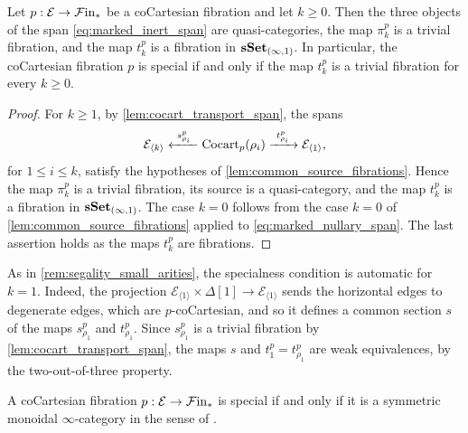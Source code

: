 \documentclass[10pt,reqno]{amsart}
\begin{document}
\begin{proposition}
\label{prop:marked_inert_span_fibrations}
Let $p:\mathcal E\to\mathcal{F}\mathrm{in}_*$ be a coCartesian fibration and let
$k\geq0$. Then the three objects of the span
\eqref{eq:marked_inert_span} are quasi-categories, the map
$\pi_k^p$ is a trivial fibration, and the map $t_k^p$ is a
fibration in $\mathbf{sSet}_{(\infty,1)}$. In particular, the coCartesian
fibration $p$ is special if and only if the map $t_k^p$ is a
trivial fibration for every $k\geq0$.
\end{proposition}

\begin{proof}
For $k\geq1$, by \cref{lem:cocart_transport_span}, the spans
\[
\mathcal E_{\langle k\rangle}
\xleftarrow{\ s_{\rho_i}^p\ }\operatorname{Cocart}_p(\rho_i)
\xrightarrow{\ t_{\rho_i}^p\ }\mathcal E_{\langle1\rangle},
\]
for $1\leq i\leq k$, satisfy the hypotheses of
\cref{lem:common_source_fibrations}. Hence the map $\pi_k^p$ is a
trivial fibration, its source is a quasi-category, and the map
$t_k^p$ is a fibration in $\mathbf{sSet}_{(\infty,1)}$. The case $k=0$
follows from the case $k=0$ of \cref{lem:common_source_fibrations}
applied to \eqref{eq:marked_nullary_span}. The last assertion holds
as the maps $t_k^p$ are fibrations.
\end{proof}

\begin{rmk}%
\label{rem:marked_arity_one}
As in \cref{rem:segality_small_arities}, the specialness condition is
automatic for $k=1$. Indeed, the projection
$\mathcal E_{\langle1\rangle}\times\Delta[1]
\to\mathcal E_{\langle1\rangle}$ sends the horizontal edges to
degenerate edges, which are $p$-coCartesian, and so it defines a
common section $s$ of the maps $s_{\rho_1}^p$ and
$t_{\rho_1}^p$. Since $s_{\rho_1}^p$ is a trivial fibration by
\cref{lem:cocart_transport_span}, the maps $s$ and
$t_1^p=t_{\rho_1}^p$ are weak equivalences, by the two-out-of-three
property.
\end{rmk}

\begin{proposition}
\label{prop:special_cocartesian_HA}
A coCartesian fibration $p:\mathcal E\to\mathcal{F}\mathrm{in}_*$ is special if and
only if it is a symmetric monoidal $\infty$-category in the sense of
\cite[Definition~2.0.0.7]{LurieHA}.
\end{proposition}
\end{document}
